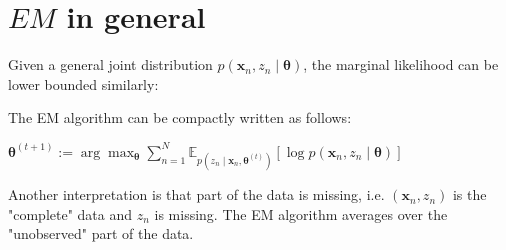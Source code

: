 \documentclass[10pt]{article}
\begin{document}
\section*{$E M$ in general}
Given a general joint distribution $p\left(\mathbf{x}_{n}, z_{n} \mid \boldsymbol{\theta}\right)$, the marginal likelihood can be lower bounded similarly:

The EM algorithm can be compactly written as follows:

$\boldsymbol{\theta}^{(t+1)}:=\arg \max _{\boldsymbol{\theta}} \sum_{n=1}^{N} \mathbb{E}_{p\left(z_{n} \mid \mathbf{x}_{n}, \boldsymbol{\theta}^{(t)}\right)}\left[\log p\left(\mathbf{x}_{n}, z_{n} \mid \boldsymbol{\theta}\right)\right]$

Another interpretation is that part of the data is missing, i.e. $\left(\mathbf{x}_{n}, z_{n}\right)$ is the "complete" data and $z_{n}$ is missing. The EM algorithm averages over the "unobserved" part of the data.
\end{document}
